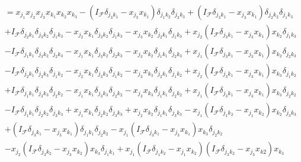 \documentclass[aps,preprint]{revtex4}%
\begin{document}
\bigskip%
\begin{align}
&  =x_{j_{1}}x_{j_{2}}x_{j_{3}}x_{k_{1}}x_{k_{2}}x_{k_{3}}-\left(
I_{\mathcal{F}}\delta_{j_{3}k_{1}}-x_{j_{3}}x_{k_{1}}\right)  \delta
_{j_{1}k_{2}}\delta_{j_{2}k_{3}}+\left(  I_{\mathcal{F}}\delta_{j_{3}k_{1}%
}-x_{j_{3}}x_{k_{1}}\right)  \delta_{j_{2}k_{2}}\delta_{j_{1}k_{3}}\nonumber\\
&  +I_{\mathcal{F}}\delta_{j_{2}k_{1}}\delta_{j_{3}k_{2}}\delta_{j_{1}k_{3}%
}-x_{j_{2}}x_{k_{1}}\delta_{j_{3}k_{2}}\delta_{j_{1}k_{3}}-x_{j_{3}}x_{k_{2}%
}\delta_{j_{2}k_{1}}\delta_{j_{1}k_{3}}+x_{j_{2}}\left(  I_{\mathcal{F}}%
\delta_{j_{3}k_{1}}-x_{j_{3}}x_{k_{1}}\right)  x_{k_{2}}\delta_{j_{1}k_{3}%
}\nonumber\\
&  -I_{\mathcal{F}}\delta_{j_{1}k_{1}}\delta_{j_{3}k_{2}}\delta_{j_{2}k_{3}%
}-x_{j_{1}}x_{k_{1}}\delta_{j_{3}k_{2}}\delta_{j_{2}k_{3}}-x_{j_{3}}x_{k_{2}%
}\delta_{j_{1}k_{1}}\delta_{j_{2}k_{3}}+x_{j_{1}}\left(  I_{\mathcal{F}}%
\delta_{j_{3}k_{1}}-x_{j_{3}}x_{k_{1}}\right)  x_{k_{2}}\delta_{j_{2}k_{3}%
}\nonumber\\
&  -I_{\mathcal{F}}\delta_{j_{2}k_{1}}\delta_{j_{3}k_{3}}\delta_{j_{1}k_{2}%
}-x_{j_{2}}x_{k_{1}}\delta_{j_{3}k_{3}}\delta_{j_{1}k_{2}}-x_{j_{3}}x_{k_{3}%
}\delta_{j_{2}k_{1}}\delta_{j_{1}k_{2}}+x_{j_{2}}\left(  I_{\mathcal{F}}%
\delta_{j_{3}k_{1}}-x_{j_{3}}x_{k_{1}}\right)  x_{k_{3}}\delta_{j_{1}k_{2}%
}\nonumber\\
&  +I_{\mathcal{F}}\delta_{j_{1}k_{1}}\delta_{j_{3}k_{3}}\delta_{j_{2}k_{2}%
}-x_{j_{1}}x_{k_{1}}\delta_{j_{3}k_{3}}\delta_{j_{2}k_{2}}-x_{j_{3}}x_{k_{3}%
}\delta_{j_{1}k_{1}}\delta_{j_{2}k_{2}}+x_{j_{1}}\left(  I_{\mathcal{F}}%
\delta_{j_{3}k_{1}}-x_{j_{3}}x_{k_{1}}\right)  x_{k_{3}}\delta_{j_{2}k_{2}%
}\nonumber\\
&  -I_{\mathcal{F}}\delta_{j_{1}k_{1}}\delta_{j_{2}k_{2}}\delta_{j_{3}k_{3}%
}+x_{j_{1}}x_{k_{1}}\delta_{j_{2}k_{2}}\delta_{j_{3}k_{3}}+x_{j_{2}}x_{k_{2}%
}\delta_{j_{1}k_{1}}\delta_{j_{3}k_{3}}-x_{j_{1}}\left(  I_{\mathcal{F}}%
\delta_{j_{1}k_{2}}-x_{j_{1}}x_{k_{2}}\right)  x_{k_{2}}\delta_{j_{3}k_{3}%
}\nonumber\\
&  +\left(  I_{\mathcal{F}}\delta_{j_{3}k_{1}}-x_{j_{3}}x_{k_{1}}\right)
\delta_{j_{1}k_{1}}\delta_{j_{2}k_{2}}-x_{j_{1}}\left(  I_{\mathcal{F}}%
\delta_{j_{3}k_{1}}-x_{j_{3}}x_{k_{1}}\right)  x_{k_{3}}\delta_{j_{2}k_{2}%
}\nonumber\\
&  -x_{j_{2}}\left(  I_{\mathcal{F}}\delta_{j_{3}k_{2}}-x_{j_{3}}x_{k_{2}%
}\right)  x_{k_{3}}\delta_{j_{1}k_{1}}+x_{j_{1}}\left(  I_{\mathcal{F}}%
\delta_{j_{1}k_{2}}-x_{j_{1}}x_{k_{2}}\right)  \left(  I_{\mathcal{F}}%
\delta_{j_{3}k_{2}}-x_{j_{3}}x_{k2}\right)  x_{k_{3}}%
\end{align}%
\end{document}
